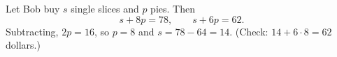 Let Bob buy $s$ single slices and $p$ pies. Then
\[
s+8p=78,\qquad s+6p=62 .
\]
Subtracting, $2p=16$, so $p=8$ and $s=78-64=\boxed{14}$. (Check: $14+6\cdot8=62$ dollars.)
